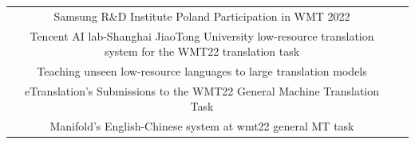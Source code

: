 \documentclass[acmsmall]{acmart}
\begin{document}
\begin{table}[h!]
\begin{center}
{\begin{tabular}{cc}
Samsung R\&D Institute Poland Participation in WMT 2022 & \cite{6-19} \\
Tencent AI lab-Shanghai JiaoTong University low-resource translation system for the WMT22 translation task & \cite{6-20} \\
Teaching unseen low-resource languages to large translation models & \cite{6-21} \\
eTranslation’s Submissions to the WMT22 General Machine Translation Task & \cite{6-22} \\
Manifold’s English-Chinese system at wmt22 general MT task & \cite{6-23} \\
\bottomrule
\end{tabular}
}
\end{center}
\end{table}
\end{document}
